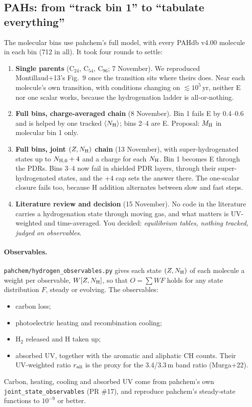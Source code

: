 \documentclass[11pt,a4paper]{article}
\newcommand{\NH}{N_{\rm H}}
\newcommand{\MH}{M_{\rm H}}
\begin{document}
\subsection{PAHs: from ``track bin 1'' to ``tabulate everything''}
The molecular bins use pahchem's full model, with every PAHdb v4.00 molecule in each bin (712 in all). It took four
rounds to settle:
\begin{enumerate}
\item \textbf{Single parents} (C$_{24}$, C$_{54}$, C$_{96}$; 7 November). We reproduced Montillaud+13's Fig.~9 once the
  transition sits where theirs does. Near each molecule's own transition, with conditions changing on $\lesssim
  10^5$\,yr, neither E nor one scalar works, because the hydrogenation ladder is all-or-nothing.
\item \textbf{Full bins, charge-averaged chain} (8 November). Bin 1 fails E by 0.4--0.6 and is helped by one tracked
  $\langle\NH\rangle$; bins 2--4 are E. Proposal: $\MH$ in molecular bin 1 only.
\item \textbf{Full bins, joint $(Z, \NH)$ chain} (13 November), with super-hydrogenated states up to $N_{\rm H,0}+4$ and
  a charge for each $\NH$. Bin 1 becomes E through the PDRs. Bins 3--4 now fail in shielded PDR layers, through their
  super-hydrogenated states, and the +4 cap sets the answer there. The one-scalar closure fails too, because H addition
  alternates between slow and fast steps.
\item \textbf{Literature review and decision} (15 November). No code in the literature carries a hydrogenation state
  through moving gas, and what matters is UV-weighted and time-averaged. You decided: \emph{equilibrium tables, nothing
  tracked, judged on observables}.
\end{enumerate}

\paragraph{Observables.} \texttt{pahchem/hydrogen\_observables.py} gives each state $(Z, \NH)$ of each molecule a weight
per observable, $W[Z,\NH]$, so that $O = \sum W F$ holds for any state distribution $F$, steady or evolving. The
observables:
\begin{itemize}
\item carbon loss;
\item photoelectric heating and recombination cooling;
\item H$_2$ released and H taken up;
\item absorbed UV, together with the aromatic and aliphatic CH counts. Their UV-weighted ratio $r_{\rm ali}$ is the
  proxy for the 3.4/3.3\,\textmu m band ratio (Murga+22).
\end{itemize}
Carbon, heating, cooling and absorbed UV come from pahchem's own \texttt{joint\_state\_observables} (PR \#17), and
reproduce pahchem's steady-state functions to $10^{-9}$ or better.
\end{document}
